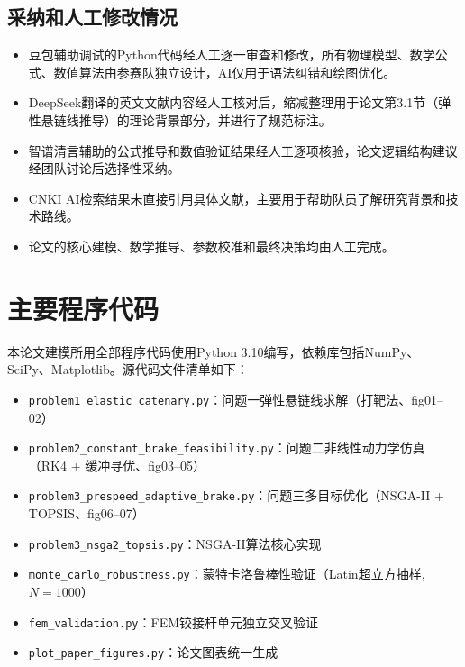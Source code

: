 \documentclass[12pt,a4paper]{ctexart}
\begin{document}
\subsection*{采纳和人工修改情况}

\begin{itemize}
  \item 豆包辅助调试的Python代码经人工逐一审查和修改，所有物理模型、数学公式、数值算法由参赛队独立设计，AI仅用于语法纠错和绘图优化。
  \item DeepSeek翻译的英文文献内容经人工核对后，缩减整理用于论文第3.1节（弹性悬链线推导）的理论背景部分，并进行了规范标注。
  \item 智谱清言辅助的公式推导和数值验证结果经人工逐项核验，论文逻辑结构建议经团队讨论后选择性采纳。
  \item CNKI AI检索结果未直接引用具体文献，主要用于帮助队员了解研究背景和技术路线。
  \item 论文的核心建模、数学推导、参数校准和最终决策均由人工完成。
\end{itemize}


\newpage
\appendix
\section{主要程序代码}

本论文建模所用全部程序代码使用Python 3.10编写，依赖库包括NumPy、SciPy、Matplotlib。源代码文件清单如下：

\begin{itemize}
  \item \texttt{problem1\_elastic\_catenary.py}：问题一弹性悬链线求解（打靶法、fig01--02）
  \item \texttt{problem2\_constant\_brake\_feasibility.py}：问题二非线性动力学仿真（RK4 + 缓冲寻优、fig03--05）
  \item \texttt{problem3\_prespeed\_adaptive\_brake.py}：问题三多目标优化（NSGA-II + TOPSIS、fig06--07）
  \item \texttt{problem3\_nsga2\_topsis.py}：NSGA-II算法核心实现
  \item \texttt{monte\_carlo\_robustness.py}：蒙特卡洛鲁棒性验证（Latin超立方抽样, $N=1000$）
  \item \texttt{fem\_validation.py}：FEM铰接杆单元独立交叉验证
  \item \texttt{plot\_paper\_figures.py}：论文图表统一生成
\end{itemize}
\end{document}
